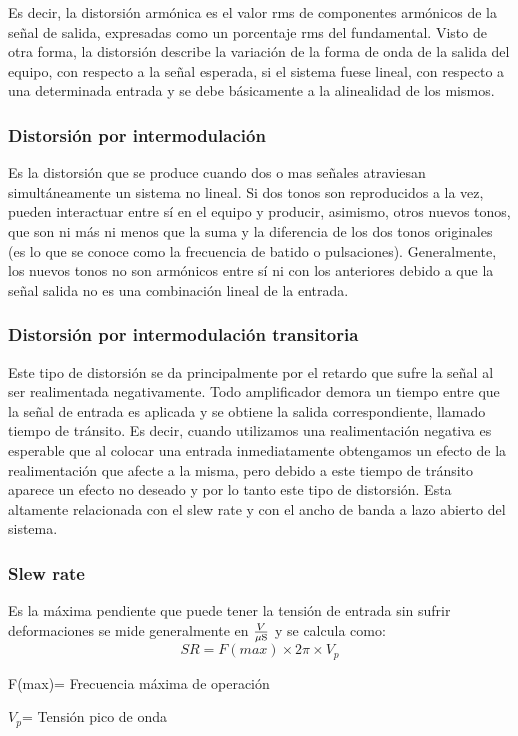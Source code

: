 Es decir, la distorsión armónica es el valor rms de componentes armónicos de la señal de salida, expresadas como un porcentaje rms del fundamental.
Visto de otra forma, la distorsión describe la variación de la forma de onda de la salida del equipo, con respecto a la señal esperada, si el sistema fuese lineal, con respecto a una determinada entrada y se debe básicamente a la alinealidad de los mismos.
\medskip 
\subsubsection*{Distorsión por intermodulación}


Es la distorsión que se produce cuando dos o mas señales atraviesan simultáneamente un sistema no lineal. Si dos tonos son reproducidos a la vez, pueden interactuar entre sí en el equipo y producir, asimismo, otros nuevos tonos, que son ni más ni menos que la suma y la diferencia de los dos tonos originales (es lo que se conoce como la frecuencia de batido o pulsaciones). Generalmente, los nuevos tonos no son armónicos entre sí ni con los anteriores debido a que la señal salida no es una combinación lineal de la entrada.
\medskip 
\subsubsection*{Distorsión por intermodulación transitoria}


Este tipo de distorsión se da principalmente por el retardo que sufre la señal al ser realimentada negativamente. Todo amplificador demora un tiempo entre que la señal de entrada es aplicada y se obtiene la salida correspondiente, llamado tiempo de tránsito. Es decir, cuando utilizamos una realimentación negativa es esperable que al colocar una entrada inmediatamente obtengamos un efecto de la realimentación que afecte a la misma, pero debido a este tiempo de tránsito aparece un efecto no deseado y por lo tanto este tipo de distorsión. Esta altamente relacionada con el slew rate y con el ancho de banda a lazo abierto del sistema. 
\medskip 
\subsubsection*{Slew rate}
	
Es la máxima pendiente que puede tener la tensión de entrada sin sufrir deformaciones se mide generalmente en $\frac{V}{\mu\mbox{s}}$ y se calcula como:
\begin{equation}
SR = F(max) \times 2\pi \times V_p
\end{equation}
\begin{description}
\item F(max)= Frecuencia máxima de operación
\item  $V_p$= Tensión pico de onda
\end{description}
\medskip 
